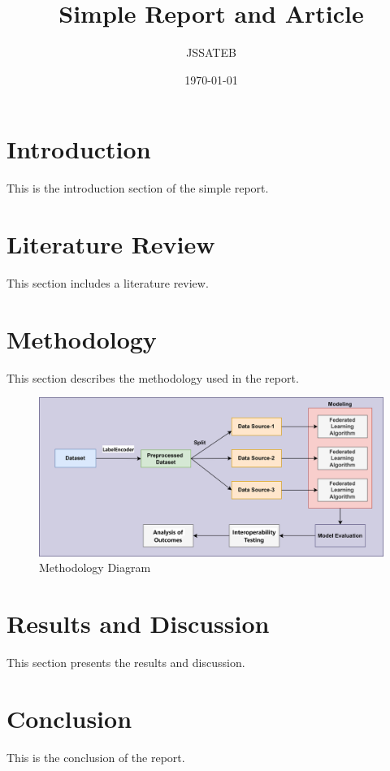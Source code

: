 \documentclass{article}
\title{Simple Report and Article}
\author{JSSATEB}
\date{\today}
\begin{document}
	\maketitle
	
	\section{Introduction}
	This is the introduction section of the simple report.
	
	\section{Literature Review}
	This section includes a literature review.
	
	\section{Methodology}
	This section describes the methodology used in the report.
	\begin{figure}[!h]
		\centering
		\includegraphics[width=\textwidth]{Aaa.png}
		\caption{Methodology Diagram}
		\label{fig:enter-label}
	\end{figure}
	\section{Results and Discussion}
		This section presents the results and discussion.
	
	\section{Conclusion}
	This is the conclusion of the report.
	
	
\end{document}
